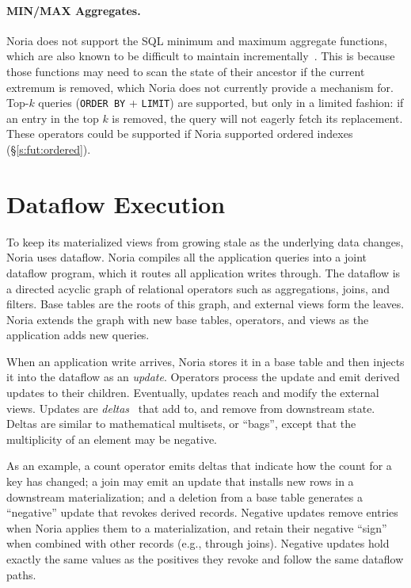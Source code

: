 \paragraph{MIN/MAX Aggregates.}
Noria does not support the SQL minimum and maximum aggregate functions, which
are also known to be difficult to maintain
incrementally~\cite{minmax-incremental}. This is because those functions may
need to scan the state of their ancestor if the current extremum is removed,
which Noria does not currently provide a mechanism for. Top-$k$ queries
(\texttt{ORDER BY} + \texttt{LIMIT}) are supported, but only in a limited
fashion: if an entry in the top $k$ is removed, the query will not eagerly fetch
its replacement. These operators could be supported if Noria supported ordered
indexes (\S\ref{s:fut:ordered}).

\section{Dataflow Execution}

To keep its materialized views from growing stale as the underlying data
changes, Noria uses dataflow. Noria compiles all the application queries into a
joint dataflow program, which it routes all application writes through. The
dataflow is a directed acyclic graph of relational operators such as
aggregations, joins, and filters. Base tables are the roots of this graph, and
external views form the leaves. Noria extends the graph with new base tables,
operators, and views as the application adds new queries.

When an application write arrives, Noria stores it in a base table and then
injects it into the dataflow as an \emph{update}. Operators process the update
and emit derived updates to their children. Eventually, updates reach and modify
the external views. Updates are \emph{deltas}~\cite{roll, differential-dataflow}
that add to, and remove from downstream state. Deltas are similar to
mathematical multisets, or ``bags'', except that the multiplicity of an element
may be negative.

As an example, a count operator emits deltas that indicate how the count for a
key has changed; a join may emit an update that installs new rows in a
downstream materialization; and a deletion from a base table generates a
``negative'' update that revokes derived records. Negative updates remove
entries when Noria applies them to a materialization, and retain their negative
``sign'' when combined with other records (e.g., through joins). Negative
updates hold exactly the same values as the positives they revoke and follow the
same dataflow paths.


